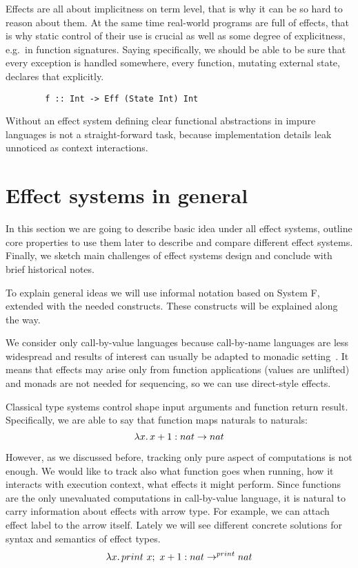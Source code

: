 \documentclass[conference]{IEEEtran}
\newcommand{\seq}{;~}
\newcommand{\ap}{~}
\begin{document}
    Effects are all about implicitness on term level, that is why it can be so hard to reason about them.
    At the same time real-world programs are full of effects, that is why static control of their use is crucial as well as some degree of explicitness, e.g.\ in function signatures.
    Saying specifically, we should be able to be sure that every exception is handled somewhere, every function, mutating external state, declares that explicitly.

    \begin{verbatim}
        f :: Int -> Eff (State Int) Int
    \end{verbatim}

    Without an effect system defining clear functional abstractions in impure languages is not a straight-forward task, because implementation details leak unnoticed as context interactions.


    \section{Effect systems in general}

    In this section we are going to describe basic idea under all effect systems, outline core properties to use them later to describe and compare different effect systems.
    Finally, we sketch main challenges of effect systems design and conclude with brief historical notes.

    To explain general ideas we will use informal notation based on System F, extended with the needed constructs.
    These constructs will be explained along the way.

    We consider only call-by-value languages because call-by-name languages are less widespread and results of interest can usually be adapted to monadic setting~\cite{wadler2003marriage}.
    It means that effects may arise only from function applications (values are unlifted) and monads are not needed for sequencing, so we can use direct-style effects.

    Classical type systems control shape input arguments and function return result.
    Specifically, we are able to say that function maps naturals to naturals:
    \[\lambda x\ldotp x + 1 : nat\to nat\]

    However, as we discussed before, tracking only pure aspect of computations is not enough.
    We would like to track also what function goes when running, how it interacts with execution context, what effects it might perform.
    Since functions are the only unevaluated computations in call-by-value language, it is natural to carry information about effects with arrow type.
    For example, we can attach effect label to the arrow itself.
    Lately we will see different concrete solutions for syntax and semantics of effect types.
    \[\lambda x\ldotp print \ap x\seq x + 1 : nat\to^{print} nat\]
\end{document}
